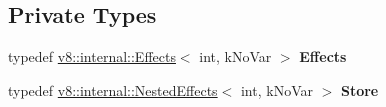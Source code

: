 \subsection*{Private Types}
\begin{DoxyCompactItemize}
\item 
typedef \hyperlink{classv8_1_1internal_1_1_effects}{v8\+::internal\+::\+Effects}$<$ int, k\+No\+Var $>$ {\bfseries Effects}\hypertarget{classv8_1_1internal_1_1_ast_typer_a2fed81b2f2d62bfd24d9ca0aeb55537a}{}\label{classv8_1_1internal_1_1_ast_typer_a2fed81b2f2d62bfd24d9ca0aeb55537a}

\item 
typedef \hyperlink{classv8_1_1internal_1_1_nested_effects}{v8\+::internal\+::\+Nested\+Effects}$<$ int, k\+No\+Var $>$ {\bfseries Store}\hypertarget{classv8_1_1internal_1_1_ast_typer_a11c795feb281454b2974aac13191a11b}{}\label{classv8_1_1internal_1_1_ast_typer_a11c795feb281454b2974aac13191a11b}

\end{DoxyCompactItemize}
